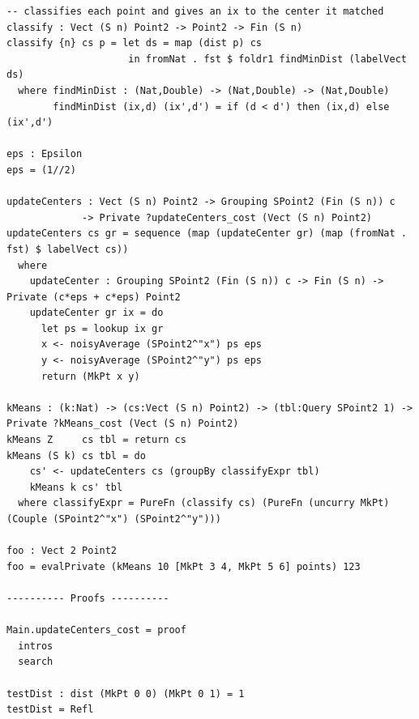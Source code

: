 \documentclass[12pt]{report}
\begin{document}
\begin{appendices}
\begin{lstlisting}[caption={tests/idris/kMeans3.idr},label={appx:kMeans3}]
-- classifies each point and gives an ix to the center it matched
classify : Vect (S n) Point2 -> Point2 -> Fin (S n)
classify {n} cs p = let ds = map (dist p) cs
                     in fromNat . fst $ foldr1 findMinDist (labelVect ds)
  where findMinDist : (Nat,Double) -> (Nat,Double) -> (Nat,Double)
        findMinDist (ix,d) (ix',d') = if (d < d') then (ix,d) else (ix',d')

eps : Epsilon
eps = (1//2)

updateCenters : Vect (S n) Point2 -> Grouping SPoint2 (Fin (S n)) c
             -> Private ?updateCenters_cost (Vect (S n) Point2)
updateCenters cs gr = sequence (map (updateCenter gr) (map (fromNat . fst) $ labelVect cs))
  where
    updateCenter : Grouping SPoint2 (Fin (S n)) c -> Fin (S n) -> Private (c*eps + c*eps) Point2
    updateCenter gr ix = do
      let ps = lookup ix gr
      x <- noisyAverage (SPoint2^"x") ps eps
      y <- noisyAverage (SPoint2^"y") ps eps
      return (MkPt x y)

kMeans : (k:Nat) -> (cs:Vect (S n) Point2) -> (tbl:Query SPoint2 1) -> Private ?kMeans_cost (Vect (S n) Point2)
kMeans Z     cs tbl = return cs
kMeans (S k) cs tbl = do
    cs' <- updateCenters cs (groupBy classifyExpr tbl)
    kMeans k cs' tbl
  where classifyExpr = PureFn (classify cs) (PureFn (uncurry MkPt) (Couple (SPoint2^"x") (SPoint2^"y")))

foo : Vect 2 Point2
foo = evalPrivate (kMeans 10 [MkPt 3 4, MkPt 5 6] points) 123

---------- Proofs ----------

Main.updateCenters_cost = proof
  intros
  search

testDist : dist (MkPt 0 0) (MkPt 0 1) = 1
testDist = Refl
\end{lstlisting}

\end{appendices}
\end{document}
